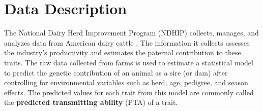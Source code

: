 \documentclass[12pt,letterpaper]{article}
\begin{document}



\section{Data Description\label{sec:data_description}}

The National Dairy Herd Improvement Program (NDHIP) collects, manages, and analyzes data from American dairy cattle \citep{Hutchins_Hueth2023}. The information it collects assesses the industry's productivity and estimates the paternal contribution to these traits. The raw data collected from farms is used to estimate a statistical model to predict the genetic contribution of an animal as a sire (or dam) after controlling for environmental variables such as herd, age, pedigree, and season effects. The predicted values for each trait from this model are commonly called the \textbf{predicted transmitting ability} (PTA) of a trait.
\end{document}
